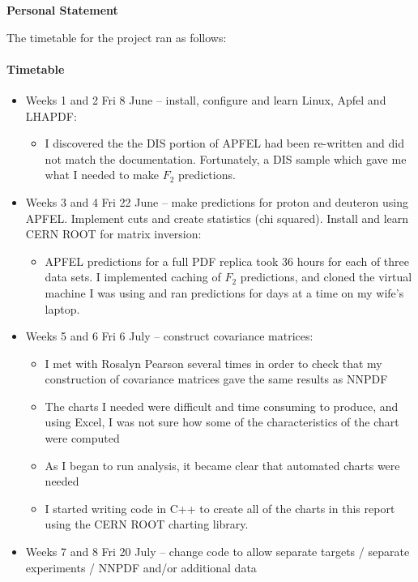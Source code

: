 \documentclass[12pt,a4paper]{report}
\begin{document}
\newpage

\begin{center}
\textbf{Personal Statement}
\end{center}

The timetable for the project ran as follows:
\paragraph{Timetable}
\begin{itemize}
\item Weeks 1 and 2 Fri 8 June -- install, configure and learn Linux, Apfel and LHAPDF:
    \begin{itemize}
    \item I discovered the the DIS portion of APFEL had been re-written and did not match the documentation. Fortunately, a DIS sample which gave me what I needed to make $F_2$ predictions.
    \end{itemize}
\item Weeks 3 and 4 Fri 22 June -- make predictions for proton and deuteron using APFEL. Implement cuts and create statistics (chi squared). Install and learn CERN ROOT for matrix inversion:
    \begin{itemize}
    \item APFEL predictions for a full PDF replica took 36 hours for each of three data sets. I implemented caching of $F_2$ predictions, and cloned the virtual machine I was using and ran predictions for days at a time on my wife's laptop.
    \end{itemize}
\item Weeks 5 and 6 Fri 6 July -- construct covariance matrices:
    \begin{itemize}
    \item I met with Rosalyn Pearson several times in order to check that my construction of covariance matrices gave the same results as NNPDF
    \item The charts I needed were difficult and time consuming to produce, and using Excel, I was not sure how some of the characteristics of the chart were computed
    \item As I began to run analysis, it became clear that automated charts were needed
    \item I started writing code in C++ to create all of the charts in this report using the CERN ROOT charting library.
    \end{itemize}
\item Weeks 7 and 8 Fri 20 July -- change code to allow separate targets / separate experiments / NNPDF and/or additional data

\end{itemize}
\end{document}

